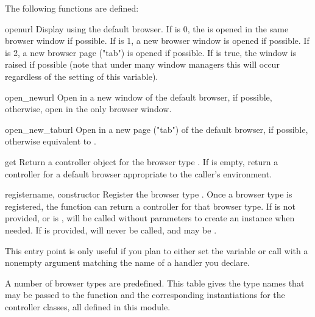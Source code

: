 The following functions are defined:

\begin{funcdesc}{open}{url}
  Display  using the default browser. If  is 0, the
   is opened in the same browser window if possible.  If  is 1,
  a new browser window is opened if possible.  If  is 2,
  a new browser page ("tab") is opened if possible.  If  is
  true, the window is raised if possible (note that under many window
  managers this will occur regardless of the setting of this variable).
\end{funcdesc}

\begin{funcdesc}{open_new}{url}
  Open  in a new window of the default browser, if possible,
  otherwise, open  in the only browser window.
\end{funcdesc}

\begin{funcdesc}{open_new_tab}{url}
  Open  in a new page ("tab") of the default browser, if possible,
  otherwise equivalent to .
\end{funcdesc}

\begin{funcdesc}{get}{}
  Return a controller object for the browser type .  If
   is empty, return a controller for a default browser
  appropriate to the caller's environment.
\end{funcdesc}

\begin{funcdesc}{register}{name, constructor}
  Register the browser type .  Once a browser type is
  registered, the  function can return a controller
  for that browser type.  If  is not provided, or is
  ,  will be called without parameters to
  create an instance when needed.  If  is provided,
   will never be called, and may be .

  This entry point is only useful if you plan to either set the
   variable or call  with a nonempty
  argument matching the name of a handler you declare.
\end{funcdesc}

A number of browser types are predefined.  This table gives the type
names that may be passed to the  function and the
corresponding instantiations for the controller classes, all defined
in this module.

